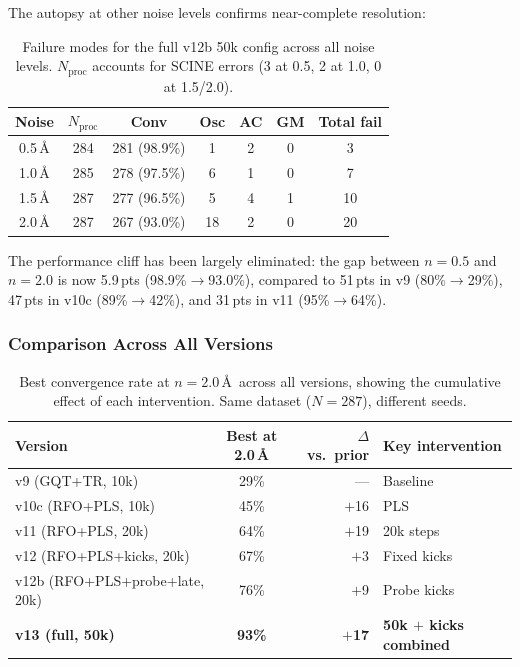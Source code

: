 \documentclass[11pt,a4paper]{article}
\theoremstyle{definition}
\begin{document}
The autopsy at other noise levels confirms near-complete resolution:

\begin{table}[h]
\centering
\caption{Failure modes for the full v12b 50k config across all noise levels.
  $N_\text{proc}$ accounts for SCINE errors (3 at 0.5, 2 at 1.0, 0 at
  1.5/2.0).}
\label{tab:v13-autopsy-all}
\begin{tabular}{ccccccc}
\toprule
Noise & $N_\text{proc}$ & Conv & Osc & AC & GM & Total fail \\
\midrule
0.5\,\AA & 284 & 281 (98.9\%) & 1 & 2 & 0 & 3 \\
1.0\,\AA & 285 & 278 (97.5\%) & 6 & 1 & 0 & 7 \\
1.5\,\AA & 287 & 277 (96.5\%) & 5 & 4 & 1 & 10 \\
2.0\,\AA & 287 & 267 (93.0\%) & 18 & 2 & 0 & 20 \\
\bottomrule
\end{tabular}
\end{table}

The performance cliff has been largely eliminated: the gap between
$n=0.5$ and $n=2.0$ is now 5.9\,pts (98.9\%$\to$93.0\%), compared to
51\,pts in v9 (80\%$\to$29\%), 47\,pts in v10c (89\%$\to$42\%), and
31\,pts in v11 (95\%$\to$64\%).

\subsubsection{Comparison Across All Versions}
\label{sec:v13-comparison}

\begin{table}[h]
\centering
\caption{Best convergence rate at $n=2.0$\,\AA\ across all versions, showing
  the cumulative effect of each intervention.  Same dataset ($N=287$), different
  seeds.}
\label{tab:v13-history}
\begin{tabular}{lcrl}
\toprule
Version & Best at 2.0\,\AA & $\Delta$ vs.\ prior & Key intervention \\
\midrule
v9 (GQT+TR, 10k) & 29\% & --- & Baseline \\
v10c (RFO+PLS, 10k) & 45\% & $+$16 & PLS \\
v11 (RFO+PLS, 20k) & 64\% & $+$19 & 20k steps \\
v12 (RFO+PLS+kicks, 20k) & 67\% & $+$3 & Fixed kicks \\
v12b (RFO+PLS+probe+late, 20k) & 76\% & $+$9 & Probe kicks \\
\textbf{v13 (full, 50k)} & \textbf{93\%} & \textbf{$+$17} & \textbf{50k $+$ kicks combined} \\
\bottomrule
\end{tabular}
\end{table}
\end{document}
